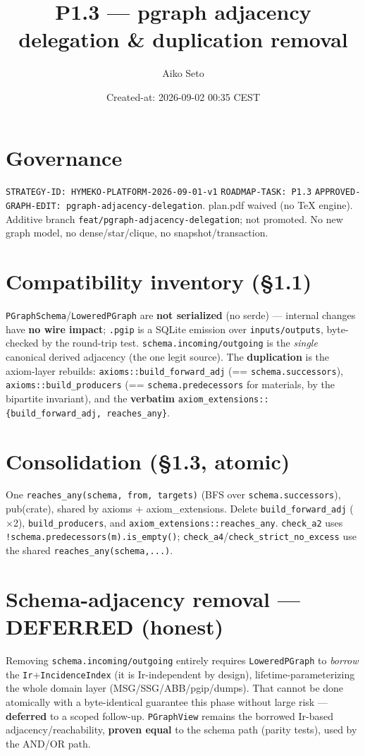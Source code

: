 \documentclass[11pt]{article}\usepackage[margin=1in]{geometry}\usepackage{hyperref}\usepackage{longtable}
\title{P1.3 --- pgraph adjacency delegation \& duplication removal}\author{Aiko Seto}
\date{Created-at: 2026-09-02 00:35 CEST}
\begin{document}
\maketitle
\section*{Governance}
\texttt{STRATEGY-ID: HYMEKO-PLATFORM-2026-09-01-v1} \textperiodcentered{} \texttt{ROADMAP-TASK: P1.3}
\textperiodcentered{} \texttt{APPROVED-GRAPH-EDIT: pgraph-adjacency-delegation}. plan.pdf waived (no TeX
engine). Additive branch \texttt{feat/pgraph-adjacency-delegation}; not promoted. No new graph model, no
dense/star/clique, no snapshot/transaction.
\section*{Compatibility inventory (\S1.1)}
\texttt{PGraphSchema}/\texttt{LoweredPGraph} are \textbf{not serialized} (no serde) --- internal changes have
\textbf{no wire impact}; \texttt{.pgip} is a SQLite emission over \texttt{inputs/outputs}, byte-checked by
the round-trip test. \texttt{schema.incoming/outgoing} is the \emph{single} canonical derived adjacency (the
one legit source). The \textbf{duplication} is the axiom-layer rebuilds: \texttt{axioms::build\_forward\_adj}
(== \texttt{schema.successors}), \texttt{axioms::build\_producers} (== \texttt{schema.predecessors} for
materials, by the bipartite invariant), and the \textbf{verbatim} \texttt{axiom\_extensions::\{build\_forward\_adj,
reaches\_any\}}.
\section*{Consolidation (\S1.3, atomic)}
One \texttt{reaches\_any(schema, from, targets)} (BFS over \texttt{schema.successors}), pub(crate), shared by
axioms + axiom\_extensions. Delete \texttt{build\_forward\_adj} ($\times$2), \texttt{build\_producers}, and
\texttt{axiom\_extensions::reaches\_any}. \texttt{check\_a2} uses \texttt{!schema.predecessors(m).is\_empty()};
\texttt{check\_a4}/\texttt{check\_strict\_no\_excess} use the shared \texttt{reaches\_any(schema,...)}.
\section*{Schema-adjacency removal --- DEFERRED (honest)}
Removing \texttt{schema.incoming/outgoing} entirely requires \texttt{LoweredPGraph} to \emph{borrow} the
\texttt{Ir}+\texttt{IncidenceIndex} (it is Ir-independent by design), lifetime-parameterizing the whole
domain layer (MSG/SSG/ABB/pgip/dumps). That cannot be done atomically with a byte-identical guarantee this
phase without large risk --- \textbf{deferred} to a scoped follow-up. \texttt{PGraphView} remains the
borrowed Ir-based adjacency/reachability, \textbf{proven equal} to the schema path (parity tests), used by
the AND/OR path.
\end{document}
